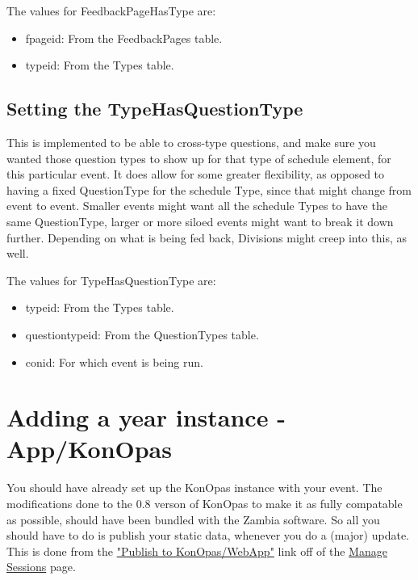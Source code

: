 \documentclass[captions=tablesignature]{scrartcl}
\begin{document}
The values for FeedbackPageHasType are:
\begin{itemize}
\item fpageid: From the FeedbackPages table.
\item typeid: From the Types table.
\end{itemize}

\subsection{Setting the TypeHasQuestionType}
\label{sec-15-3}

This is implemented to be able to cross-type questions, and make
sure you wanted those question types to show up for that type of
schedule element, for this particular event.  It does allow for
some greater flexibility, as opposed to having a fixed QuestionType
for the schedule Type, since that might change from event to event.
Smaller events might want all the schedule Types to have the same
QuestionType, larger or more siloed events might want to break it
down further.  Depending on what is being fed back, Divisions might
creep into this, as well.

The values for TypeHasQuestionType are:
\begin{itemize}
\item typeid: From the Types table.
\item questiontypeid: From the QuestionTypes table.
\item conid: For which event is being run.
\end{itemize}

\section{Adding a year instance - App/KonOpas}
\label{sec-16}

You should have already set up the KonOpas instance with your
event.  The modifications done to the 0.8 verson of KonOpas to make
it as fully compatable as possible, should have been bundled with
the Zambia software.  So all you should have to do is publish your
static data, whenever you do a (major) update.  This is done from
the \href{../webpages/KonOpasData.php}{"Publish to KonOpas/WebApp"} link off of the \href{../webpages/StaffManageSessions.php}{Manage Sessions} page.
\end{document}
